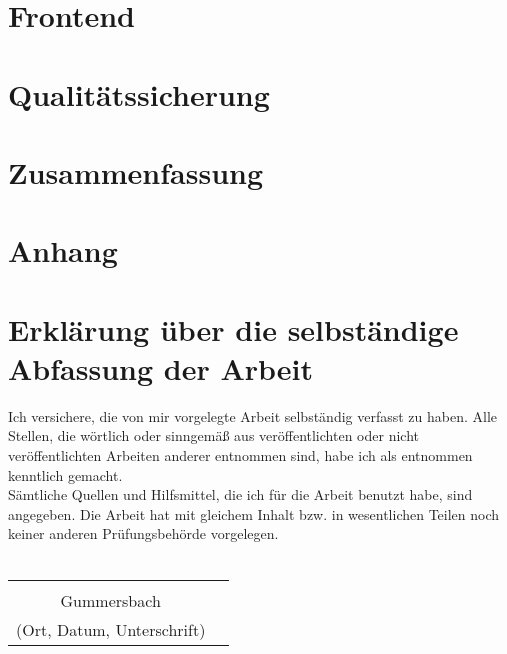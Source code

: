 \documentclass[a4paper,12pt,oneside]{article}
\begin{document}
\newpage
\section{Frontend}\label{kap_Frontend}


\newpage
\section{Qualitätssicherung }\label{kap_QS}


\newpage
\section*{Zusammenfassung }\label{kap_ZF}




\newpage
\section*{Anhang}\label{anhang}


\newpage
\printbibliography[heading=bibintoc]

\pagestyle{empty}
\section*{Erklärung über die selbständige\\Abfassung der Arbeit} %
Ich versichere, die von mir vorgelegte Arbeit selbständig verfasst zu haben.
Alle Stellen, die wörtlich oder sinngemäß aus veröffentlichten oder nicht veröffentlichten Arbeiten anderer entnommen sind,
habe ich als entnommen kenntlich gemacht.\\
Sämtliche Quellen und Hilfsmittel, die ich für die Arbeit benutzt habe, sind
angegeben. Die Arbeit hat mit gleichem Inhalt bzw. in wesentlichen Teilen noch keiner anderen Prüfungsbehörde vorgelegen.\\\\
\begin{tabular}{cp{7cm}}
                                    &             \\
          Gummersbach                   &             \\ \hline
  \small (Ort, Datum, Unterschrift) & \normalsize \\
\end{tabular}


\newpage
\thispagestyle{empty}

\end{document}
